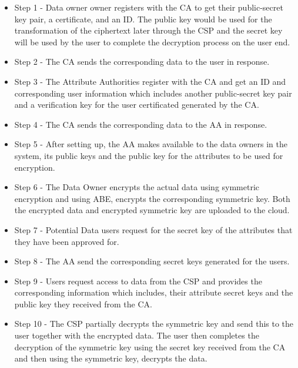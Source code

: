 \begin{itemize}
	\item Step 1 - Data owner owner registers with the CA to get their public-secret key pair, a certificate, and an ID. The public key would be used for the transformation of the ciphertext later through the CSP and the secret key will be used by the user to complete the decryption process on the user end.
	
	\item Step 2 - The CA sends the corresponding data to the user in response.
	
	\item Step 3 - The Attribute Authorities register with the CA and get an ID and corresponding user information which includes another public-secret key pair and a verification key for the user certificated generated by the CA.
	
	\item Step 4 - The CA sends the corresponding data to the AA in response.
	
	\item Step 5 - After setting up, the AA makes available to the data owners in the system, its public keys and the public key for the attributes to be used for encryption.
	
	\item Step 6 - The Data Owner encrypts the actual data using symmetric encryption and using ABE, encrypts the corresponding symmetric key. Both the encrypted data and encrypted symmetric key are uploaded to the cloud.
	
	\item Step 7 - Potential Data users request for the secret key of the attributes that they have been approved for.
	
	\item Step 8 - The AA send the corresponding secret keys generated for the users.
	
	\item Step 9 - Users request access to data from the CSP and provides the corresponding information which includes, their attribute secret keys and the public key they received from the CA.
	
	\item Step 10 - The CSP partially decrypts the symmetric key and send this to the user together with the encrypted data. The user then completes the decryption of the symmetric key using the secret key received from the CA and then using the symmetric key, decrypts the data.
\end{itemize}

